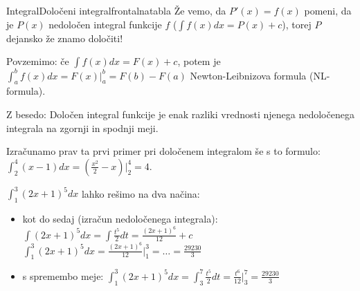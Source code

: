 \begin{priprava}{}{}{Integral}{Določeni integral}{frontalna}{tabla}
Že vemo, da $ P'(x) = f(x) $ pomeni, da je $ P(x) $ nedoločen integral funkcije $ f $ ($ \int f(x) dx = P(x) + c $), torej $ P $ dejansko že znamo določiti!

Povzemimo: če \textcolor{zelena}{$ \int f(x) dx = F(x) + c $}, potem je \textcolor{rdeca}{$\int_a^b f(x) dx = F(x)|_a^b = F(b) - F(a) $}  Newton-Leibnizova formula (NL-formula).

Z besedo: Določen integral funkcije je enak razliki vrednosti njenega nedoločenega integrala na zgornji in spodnji meji.

Izračunamo prav ta prvi primer pri določenem integralom še s to formulo: $ \int_2^4 (x - 1) dx = (\frac{x^2}{2} - x) |_2^4 = 4 $.



$ \int_1^3 (2x + 1)^5 dx $ lahko rešimo na dva načina:
\begin{itemize}
    \item kot do sedaj (izračun nedoločenega integrala): $ \int (2x + 1)^5 dx = \int \frac{t^5}{2} dt = \frac{(2x + 1)^6}{12} + c $
    \subitem $ \int_1^3 (2x + 1)^5 dx = \frac{(2x + 1)^6}{12} |_1^3 = \ldots = \frac{29230}{3} $
    \item s spremembo meje: $ \int_1^3 (2x + 1)^5 dx = \int_3^7 \frac{t^5}{2} dt = \frac{t^6}{12} |_3^7 = \frac{29230}{3} $
\end{itemize}


\end{priprava}